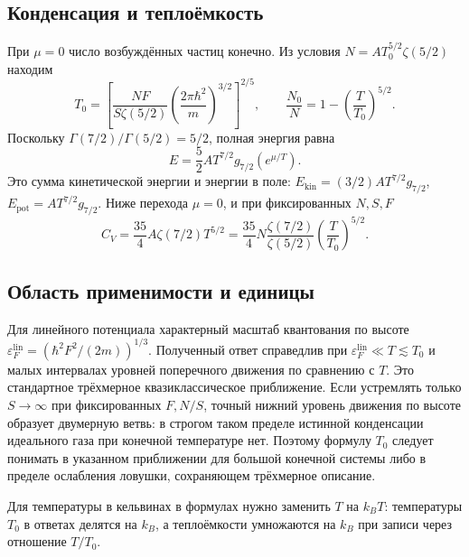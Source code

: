 \documentclass[../final.tex]{subfiles}
\begin{document}
\subsection*{Конденсация и теплоёмкость}
При $\mu=0$ число возбуждённых частиц конечно. Из условия
$N=A T_0^{5/2}\zeta(5/2)$ находим
\[
 \boxed{T_0=\left[\frac{NF}{S\zeta(5/2)}
 \left(\frac{2\pi\hbar^2}{m}\right)^{3/2}\right]^{2/5}},
 \qquad \frac{N_0}{N}=1-\left(\frac{T}{T_0}\right)^{5/2}.
\]
Поскольку $\Gamma(7/2)/\Gamma(5/2)=5/2$, полная энергия равна
\[
 E=\frac52 A T^{7/2}g_{7/2}(e^{\mu/T}).
\]
Это сумма кинетической энергии и энергии в поле:
$E_{\mathrm{kin}}=(3/2)AT^{7/2}g_{7/2}$,
$E_{\mathrm{pot}}=AT^{7/2}g_{7/2}$.
Ниже перехода $\mu=0$, и при фиксированных $N,S,F$
\[
 \boxed{C_V=\frac{35}{4}A\zeta(7/2)T^{5/2}
 =\frac{35}{4}N\frac{\zeta(7/2)}{\zeta(5/2)}
 \left(\frac{T}{T_0}\right)^{5/2}}.
\]

\subsection*{Область применимости и единицы}
Для линейного потенциала характерный масштаб квантования по высоте
$\varepsilon_F^{\mathrm{lin}}=(\hbar^2F^2/(2m))^{1/3}$.
Полученный ответ справедлив при
$\varepsilon_F^{\mathrm{lin}}\ll T\lesssim T_0$ и малых интервалах
уровней поперечного движения по сравнению с $T$.
Это стандартное трёхмерное квазиклассическое приближение.
Если устремлять только $S\to\infty$ при фиксированных $F,N/S$,
точный нижний уровень движения по высоте образует двумерную ветвь:
в строгом таком пределе истинной конденсации идеального газа при
конечной температуре нет. Поэтому формулу $T_0$ следует понимать
в указанном приближении для большой конечной системы либо в
пределе ослабления ловушки, сохраняющем трёхмерное описание.

Для температуры в кельвинах в формулах нужно заменить $T$ на $k_BT$:
температуры $T_0$ в ответах делятся на $k_B$, а теплоёмкости
умножаются на $k_B$ при записи через отношение $T/T_0$.
\end{document}
